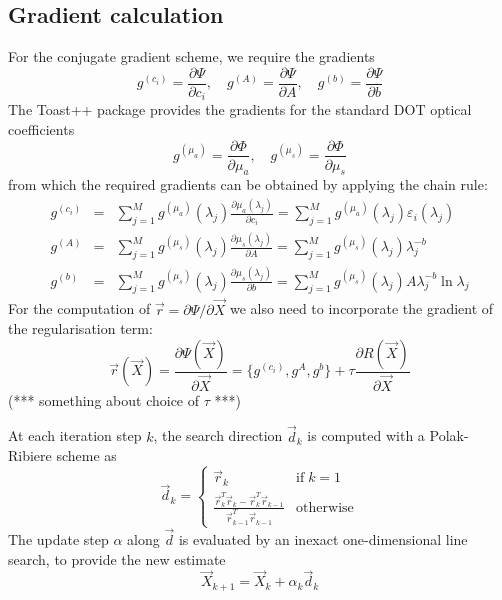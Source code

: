 \subsection{Gradient calculation}
For the conjugate gradient scheme, we require the gradients
\begin{equation}
g^{(c_i)} = \frac{\partial \Psi}{\partial c_i}, \quad g^{(A)} = \frac{\partial \Psi}{\partial A}, \quad g^{(b)} = \frac{\partial \Psi}{\partial b}
\end{equation}
The Toast++ package provides the gradients for the standard DOT optical coefficients
\begin{equation}
g^{(\mu_a)} = \frac{\partial \Phi}{\partial \mu_a}, \quad g^{(\mu_s)} = \frac{\partial \Phi}{\partial \mu_s}
\end{equation}
from which the required gradients can be obtained by applying the chain rule:
\begin{eqnarray}
g^{(c_i)} &=& \sum_{j=1}^M g^{(\mu_a)}(\lambda_j) \frac{\partial \mu_a(\lambda_j)}{\partial c_i} = \sum_{j=1}^M g^{(\mu_a)}(\lambda_j) \varepsilon_i(\lambda_j) \\
g^{(A)} &=& \sum_{j=1}^M g^{(\mu_s)}(\lambda_j) \frac{\partial \mu_s(\lambda_j)}{\partial A} = \sum_{j=1}^M g^{(\mu_s)}(\lambda_j) \lambda_j^{-b} \\
g^{(b)} &=& \sum_{j=1}^M g^{(\mu_s)}(\lambda_j) \frac{\partial \mu_s(\lambda_j)}{\partial b} = \sum_{j=1}^M g^{(\mu_s)}(\lambda_j) A \lambda_j^{-b} \ln{\lambda_j}
\end{eqnarray}
For the computation of $\vec{r} = \partial \Psi/\partial \vec{X}$ we also need to incorporate the gradient of the regularisation term:
\begin{equation}
\vec{r}(\vec{X}) = \frac{\partial \Psi(\vec{X})}{\partial \vec{X}} = \lbrace g^{(c_i)}, g^A, g^b \rbrace + \tau \frac{\partial R(\vec{X})}{\partial \vec{X}}
\end{equation}
(*** something about choice of $\tau$ ***)

At each iteration step $k$, the search direction $\vec{d}_k$ is computed with a Polak-Ribiere scheme as
\begin{equation}
\vec{d}_k = \left\lbrace \begin{array}{ll}
\vec{r}_k & \mathrm{if\; } k=1 \\
\frac{\vec{r}_k^T \vec{r}_k - \vec{r}_k^T \vec{r}_{k-1}}{\vec{r}_{k-1}^T \vec{r}_{k-1}} & \mathrm{otherwise}
\end{array}\right.
\end{equation}
The update step $\alpha$ along $\vec{d}$ is evaluated by an inexact one-dimensional line search, to provide the new estimate
\begin{equation}
\vec{X}_{k+1} = \vec{X}_k + \alpha_k \vec{d}_k
\end{equation}

